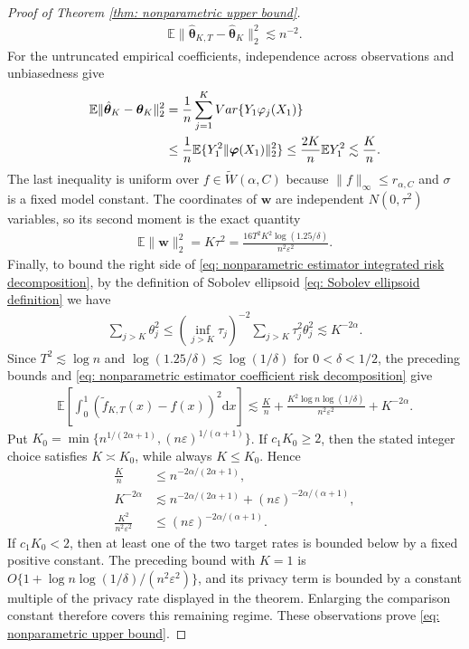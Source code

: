 \documentclass[letterpaper,12pt]{article}
\renewcommand{\d}{\mathrm{d}}
\numberwithin{equation}{section}
\theoremstyle{plain}
\numberwithin{Theorem}{section}
\numberwithin{proposition}{section}
\numberwithin{Lemma}{section}
{
	\theoremstyle{definition}
	\newtheorem{Definition}{Definition}
	\newtheorem{example}{Example}
	\numberwithin{example}{section}
	\newtheorem{fact}{Fact}
	\numberwithin{fact}{section}
	\newtheorem{remark}{Remark}
}
\newcommand{\rev}[1]{#1}
\newcommand{\1}{\mathbbm{1}}
\def\bth{{\boldsymbol{\theta}}}
\def\Var{{\rm Var}}
\def\E{\mathbb{E}}
\begin{document}
\begin{proof}[Proof of Theorem \ref{thm: nonparametric upper bound}]
{	\begin{align*}
		\E \|\hat\bth_{K, T} - \hat\bth_K\|_2^2\lesssim n^{-2}.
	\end{align*}}
		For the untruncated empirical coefficients, independence across observations and unbiasedness give
		\begin{align*}
		\E\|\hat\bth_K-\bth_K\|_2^2
		&=\frac1n\sum_{j=1}^K\Var\{Y_1\varphi_j(X_1)\}\\
		&\leq\frac1n\E\{Y_1^2\|\bm\varphi(X_1)\|_2^2\}
		\leq\frac{2K}{n}\E Y_1^2
		\lesssim\frac Kn.
		\end{align*}
			The last inequality is uniform over $f\in\widetilde W(\alpha,C)$ because $\|f\|_\infty\leq r_{\alpha,C}$ and $\sigma$ is a fixed model constant. \rev{The coordinates of $\bm w$ are independent $N(0,\tau^2)$ variables, so its second moment is the exact quantity
	\begin{align}\label{eq: nonparametric gaussian noise second moment}
	\E\|\bm w\|_2^2=K\tau^2
	=\frac{16T^2K^2\log(1.25/\delta)}{n^2\varepsilon^2}.
	\end{align}
		} Finally, to bound the right side of \eqref{eq: nonparametric estimator integrated risk decomposition}, by the definition of Sobolev ellipsoid \eqref{eq: Sobolev ellipsoid definition} we have
	\begin{align*}
		\rev{\sum_{j > K} \theta_j^2 \leq \left(\inf_{j>K}\tau_j\right)^{-2}\sum_{j > K} \tau_j^2\theta_j^2 \lesssim K^{-2\alpha}.}
	\end{align*}
		Since $T^2\lesssim\log n$ and $\log(1.25/\delta)\lesssim\log(1/\delta)$ for $0<\delta<1/2$, the preceding bounds and \eqref{eq: nonparametric estimator coefficient risk decomposition} give
	\begin{align*}
		\E \left[\int_0^1 (\tilde f_{K, T}(x) - f(x))^2 \d x \right] \lesssim \frac{K}{n} + \rev{\frac{K^2\log n\log(1/\delta)}{n^2\varepsilon^2}} + K^{-2\alpha}.
	\end{align*}
		\rev{Put $K_0=\min\{n^{1/(2\alpha+1)},(n\varepsilon)^{1/(\alpha+1)}\}$. If $c_1K_0\geq2$, then the stated integer choice satisfies $K\asymp K_0$, while always $K\leq K_0$. Hence
		\begin{align*}
		\frac Kn&\leq n^{-2\alpha/(2\alpha+1)},\\
		K^{-2\alpha}&\lesssim n^{-2\alpha/(2\alpha+1)}
		+(n\varepsilon)^{-2\alpha/(\alpha+1)},\\
		\frac{K^2}{n^2\varepsilon^2}
		&\leq(n\varepsilon)^{-2\alpha/(\alpha+1)}.
		\end{align*}
	If $c_1K_0<2$, then at least one of the two target rates is bounded below by a fixed positive constant. The preceding bound with $K=1$ is $O\{1+\log n\log(1/\delta)/(n^2\varepsilon^2)\}$, and its privacy term is bounded by a constant multiple of the privacy rate displayed in the theorem. Enlarging the comparison constant therefore covers this remaining regime. These observations prove \eqref{eq: nonparametric upper bound}.}
\end{proof}

	
\end{document}

